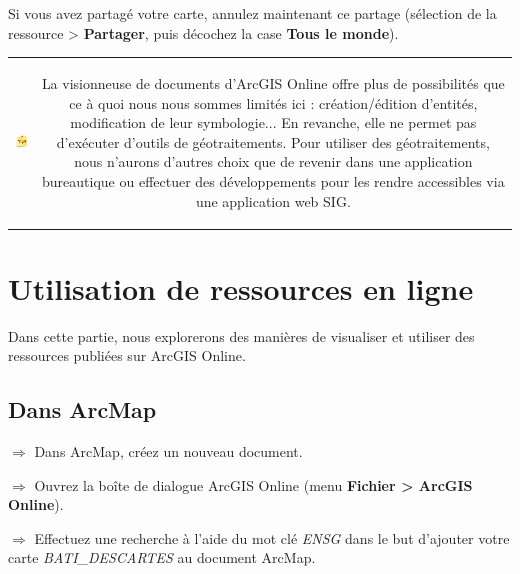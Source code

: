 \documentclass[11pt]{article}
\newcommand{\action}{$\Rightarrow$ }
\newcommand{\reponse}{
	\begin{tabbing}
	\hspace{2cm}\=\kill
	Réponse \> ............................................................................................ \\
 	\> ............................................................................................
	\end{tabbing}
}
\newenvironment{note}{%
	\begin{tabular}[t t]{c c}
		\includegraphics{img/tips.png}
		 &
		\begin{minipage}[c]{0.9\linewidth}
			\begin{sffamily}
}{%
			\end{sffamily}
		\end{minipage}
	\end{tabular}
}
\begin{document}
Si vous avez partagé votre carte, annulez maintenant ce partage (sélection de la ressource > \textbf{Partager}, puis décochez la case \textbf{Tous le monde}).

\begin{note}
La visionneuse de documents d'ArcGIS Online offre plus de possibilités que ce à quoi nous nous sommes limités ici : création/édition d'entités, modification de leur symbologie... En revanche, elle ne permet pas d'exécuter d'outils de géotraitements. Pour utiliser des géotraitements, nous n'aurons d'autres choix que de revenir dans une application bureautique ou effectuer des développements pour les rendre accessibles via une application web SIG.
\end{note}

%
%
%
%
%
%
%



\section{Utilisation de ressources en ligne}
Dans cette partie, nous explorerons des manières de visualiser et utiliser des ressources publiées sur ArcGIS Online.

\subsection{Dans ArcMap}
\action Dans ArcMap, créez un nouveau document.

\action Ouvrez la  boîte de dialogue ArcGIS Online (menu \textbf{Fichier > ArcGIS Online}).

\action Effectuez une recherche à l'aide du mot clé \textit{ENSG} dans le but d'ajouter votre carte \textit{BATI\_DESCARTES} au document ArcMap.
\end{document}

